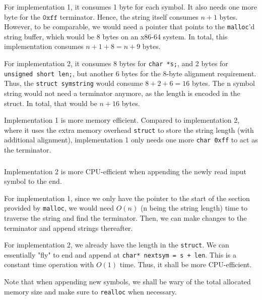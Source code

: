 \documentclass[12pt]{article}
\begin{document}
\subsubsection{}

For implementation 1, it consumes 1 byte for each symbol. It also needs one more byte for the $\mathtt{0xff}$ terminator. Hence, the string itself consumes $n + 1$ bytes. However, to be comparable, we would need a pointer that points to the \texttt{malloc}'d string buffer, which would be 8 bytes on an x86-64 system. In total, this implementation consumes $n + 1 + 8 = n + 9$ bytes.

For implementation 2, it consumes 8 bytes for \texttt{char *s;}, and 2 bytes for \texttt{unsigned short len;}, but another 6 bytes for the 8-byte alignment requirement. Thus, the \texttt{struct symstring} would consume $8 + 2 + 6 = 16$ bytes. The n symbol string would not need a terminator anymore, as the length is encoded in the struct. In total, that would be $n + 16$ bytes.

Implementation 1 is more memory efficient. Compared to implementation 2, where it uses the extra memory overhead \texttt{struct} to store the string length (with additional alignment), implementation 1 only needs one more \texttt{char 0xff} to act as the terminator.

\subsubsection{}

Implementation 2 is more CPU-efficient when appending the newly read input symbol to the end. 

For implementation 1, since we only have the pointer to the start of the section provided by \texttt{malloc}, we would need $O(n)$ (n being the string length) time to traverse the string and find the terminator. Then, we can make changes to the terminator and append strings thereafter.

For implementation 2, we already have the length in the \texttt{struct}. We can essentially "fly" to end and append at \texttt{char* nextsym = s + len}. This is a constant time operation with $O(1)$ time. Thus, it shall be more CPU-efficient.

Note that when appending new symbols, we shall be wary of the total allocated memory size and make sure to \texttt{realloc} when necessary.

\subsubsection{}
\end{document}
